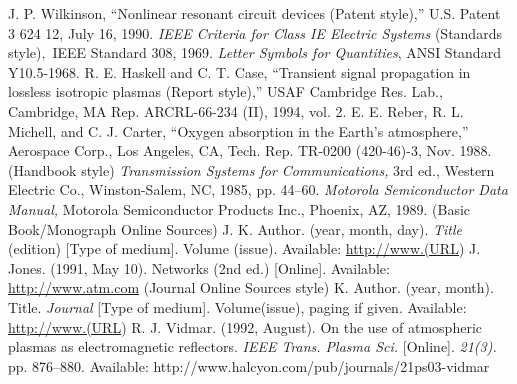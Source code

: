 \documentclass[transmag]{IEEEtran}
\begin{document}
\begin{thebibliography}{00}
 J. P. Wilkinson, ``Nonlinear resonant circuit devices (Patent style),'' U.S. Patent 3 624 12, July 16, 1990. 
 \emph{IEEE Criteria for Class IE Electric Systems} (Standards style)$,$ IEEE Standard 308, 1969.
 \emph{Letter Symbols for Quantities}, ANSI Standard Y10.5-1968.
 R. E. Haskell and C. T. Case, ``Transient signal propagation in lossless isotropic plasmas (Report style),'' USAF Cambridge Res. Lab., Cambridge, MA Rep. ARCRL-66-234 (II), 1994, vol. 2.
 E. E. Reber, R. L. Michell, and C. J. Carter, ``Oxygen absorption in the Earth's atmosphere,'' Aerospace Corp., Los Angeles, CA, Tech. Rep. TR-0200 (420-46)-3, Nov. 1988.
 (Handbook style) \emph{Transmission Systems for Communications,} 3rd ed., Western Electric Co., Winston-Salem, NC, 1985, pp. 44--60.
 \emph{Motorola Semiconductor Data Manual,} Motorola Semiconductor Products Inc., Phoenix, AZ, 1989.
 (Basic Book/Monograph Online Sources) J. K. Author. (year, month, day). \emph{Title} (edition) [Type of medium]. Volume (issue). Available: \underline {http://www.(URL})
 J. Jones. (1991, May 10). Networks (2nd ed.) [Online]. Available: \underline {http://www.atm.com}
 (Journal Online Sources style) K. Author. (year, month). Title. \emph{Journal} [Type of medium]. Volume(issue), paging if given. Available: \underline {http://www.(URL})
 R. J. Vidmar. (1992, August). On the use of atmospheric plasmas as electromagnetic reflectors. \emph{IEEE Trans. Plasma Sci.} [Online]. \emph{21(3).} pp. 876--880. Available: http://www.halcyon.com/pub/journals/21ps03-vidmar
\end{thebibliography}
\end{document}
